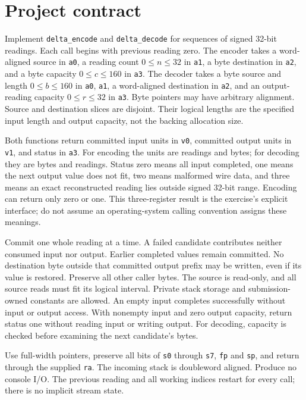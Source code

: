 \section*{Project contract}
Implement \texttt{delta\_encode} and \texttt{delta\_decode} for sequences of signed
32-bit readings. Each call begins with previous reading zero. The encoder takes a
word-aligned source in \texttt{a0}, a reading count \(0\leq n\leq32\) in
\texttt{a1}, a byte destination in \texttt{a2}, and a byte capacity
\(0\leq c\leq160\) in \texttt{a3}. The decoder takes a byte source and length
\(0\leq b\leq160\) in \texttt{a0}, \texttt{a1}, a word-aligned destination in
\texttt{a2}, and an output-reading capacity \(0\leq r\leq32\) in \texttt{a3}.
Byte pointers may have arbitrary alignment. Source and destination slices are disjoint.
Their logical lengths are the specified input length and output capacity, not the
backing allocation size.

Both functions return committed input units in \texttt{v0}, committed output units
in \texttt{v1}, and status in \texttt{a3}. For encoding the units are readings and
bytes; for decoding they are bytes and readings. Status zero means all input completed,
one means the next output value does not fit, two means malformed wire data, and three
means an exact reconstructed reading lies outside signed 32-bit range. Encoding can
return only zero or one. This three-register result is the exercise's explicit
interface; do not assume an operating-system calling convention assigns these meanings.

Commit one whole reading at a time. A failed candidate contributes neither consumed
input nor output. Earlier completed values remain committed. No destination byte
outside that committed output prefix may be written, even if its value is restored.
Preserve all other caller bytes. The source is read-only, and all source reads must
fit its logical interval. Private stack storage and submission-owned constants are
allowed. An empty input completes successfully without input or output access. With nonempty input
and zero output capacity, return status one without reading input or writing output.
For decoding, capacity is checked before examining the next candidate's bytes.

Use full-width pointers, preserve all bits of \texttt{s0} through \texttt{s7},
\texttt{fp} and \texttt{sp}, and return through the supplied \texttt{ra}. The incoming
stack is doubleword aligned. Produce no console I/O. The previous reading and all
working indices restart for every call; there is no implicit stream state.

